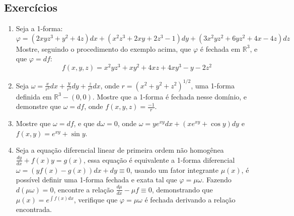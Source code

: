 \subsection{Exercícios}

\begin{enumerate}
\item Seja a 1-forma: 
			\[
			\varphi = (2xyz^3 + y^2 + 4z)dx 
			+ (x^2z^3 + 2xy + 2z^3 - 1)dy 
			+ (3x^2yz^2 + 6yz^2 + 4x - 4z)dz
			\]
      Mostre, seguindo o procedimento do exemplo acima, que 
      $\varphi$ é fechada em $\mathbb{R}^3$, e que $\varphi = df$:
      \[
      f(x,y,z) = x^2yz^3 + xy^2 + 4xz + 4xy^3 - y - 2z^2
      \]
\item Seja $\omega = \frac{x}{r^3}dx + \frac{y}{r^3}dy 
+ \frac{z}{r^3}dx$, onde $r = (x^2+y^2+z^2)^{1/2}$, 
uma 1-forma definida em $\mathbb{R}^3-(0,0)$. Mostre que 
a 1-forma é fechada nesse domínio, e demonstre que 
$\omega = df$, onde $f(x,y,z) = \frac{-1}{r}$.
\item Mostre que $\omega = df$, e que $d\omega = 0$, onde 
$\omega = ye^{xy}dx + (xe^{xy} + \cos y)dy$ e $f(x,y) = e^{xy} 
+ \sin y$.
\item Seja a equação diferencial linear de primeira ordem não 
homogênea $\frac{dy}{dx} + f(x)y = g(x)$, essa equação é 
equivalente a 1-forma diferencial $\omega = (yf(x) - g(x))dx 
+ dy \equiv 0$, usando um fator integrante $\mu(x)$, é 
possível definir uma 1-forma fechada e exata tal que 
$\varphi = \mu \omega$. Fazendo $d(\mu\omega) = 0$, 
encontre a relação $\frac{d\mu}{dx} - \mu f \equiv 0$, 
demonstrando que $\mu(x) = e^{\int f(x) dx}$, verifique que 
$\varphi = \mu\omega$ é fechada derivando a relação encontrada.
\end{enumerate}
